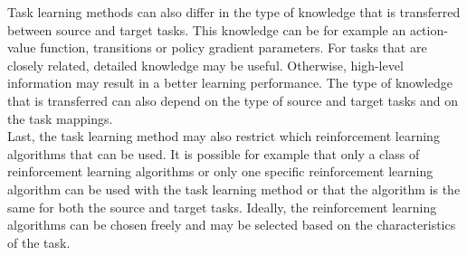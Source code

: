 \documentclass[a4paper]{article}
\begin{document}
Task learning methods can also differ in the type of knowledge that is transferred between source and target tasks. This knowledge can be for example an action-value function, transitions or policy gradient parameters. For tasks that are closely related, detailed knowledge may be useful. Otherwise, high-level information may result in a better learning performance. The type of knowledge that is transferred can also depend on the type of source and target tasks and on the task mappings.\\

Last, the task learning method may also restrict which reinforcement learning algorithms that can be used. It is possible for example that only a class of reinforcement learning algorithms or only one specific reinforcement learning algorithm can be used with the task learning method or that the algorithm is the same for both the source and target tasks. Ideally, the reinforcement learning algorithms can be chosen freely and may be selected based on the characteristics of the task.\\
\end{document}
